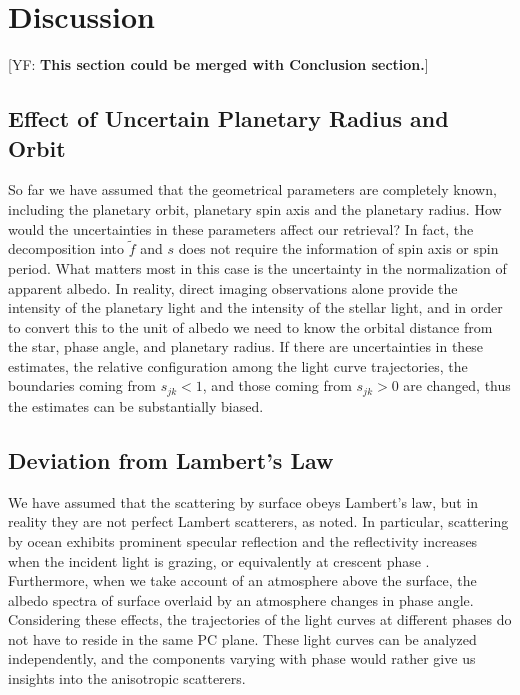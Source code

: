 \documentclass[iop,numberedappendix,apj,]{emulateapj}
\def\fast{\tilde f}
\def\memoYF#1{\color{red}[YF: {\bf #1}]\color{black}}
\begin{document}
\section{Discussion}
\label{s:discussion}

\memoYF{This section could be merged with Conclusion section.}

\subsection{Effect of Uncertain Planetary Radius and Orbit}

So far we have assumed that the geometrical parameters are completely known, including the planetary orbit, planetary spin axis and the planetary radius. 
How would the uncertainties in these parameters affect our retrieval?
In fact, the decomposition into $\fast $ and $s$ does not require the information of spin axis or spin period. 
What matters most in this case is the uncertainty in the normalization of apparent albedo. 
In reality, direct imaging observations alone provide the intensity of the 
planetary light and the intensity of the stellar light, and in order to convert this to the unit of albedo we need to know the orbital distance from the star, phase angle, and planetary radius. 
If there are uncertainties in these estimates, the relative configuration among the light curve trajectories, the boundaries coming from $s_{jk} < 1$, and those coming from $s_{jk} > 0$ are changed, thus the estimates can be substantially biased. 

\subsection{Deviation from Lambert's Law}
\label{ss:deviateLambert}

We have assumed that the scattering by surface obeys Lambert's law, but in reality they are not perfect Lambert scatterers, as noted. 
In particular, scattering by ocean exhibits prominent specular reflection and the reflectivity increases when the incident light is grazing, or equivalently at crescent phase \citep[e.g.,][]{Williams2008}. 
Furthermore, when we take account of an atmosphere above the surface, the albedo spectra of surface overlaid by an atmosphere changes in phase angle.  
Considering these effects, the trajectories of the light curves at different phases do not have to reside in the same PC plane. 
These light curves can be analyzed independently, and the components varying with phase would rather give us insights into the anisotropic scatterers. 
\end{document}
